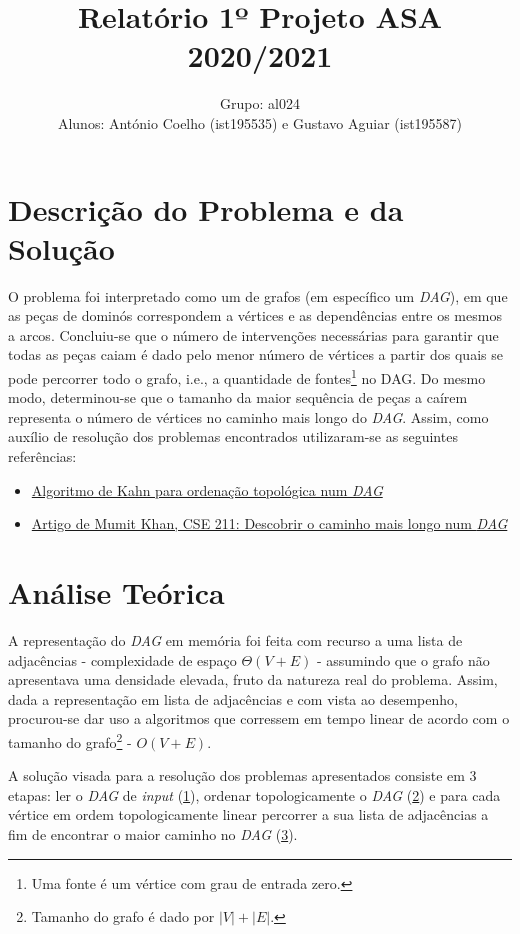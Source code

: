 \documentclass[12pt]{article}
\author{
	Grupo: al024\\Alunos: António Coelho (ist195535) e Gustavo Aguiar (ist195587)
}
\title{Relatório 1º Projeto ASA 2020/2021}
\date{}
\begin{document}
\maketitle
\section{Descrição do Problema e da Solução}
O problema foi interpretado como um de grafos (em específico um \emph{DAG}), em que as peças de dominós correspondem a vértices e as dependências entre os mesmos a arcos. Concluiu-se que o número de intervenções necessárias para garantir que todas as peças caiam é dado pelo menor número de vértices a partir dos quais se pode percorrer todo o grafo, i.e., a quantidade de fontes\footnote{Uma fonte é um vértice com grau de entrada zero.} no DAG. Do mesmo modo, determinou-se que o tamanho da maior sequência de peças a caírem representa o número de vértices no caminho mais longo do \emph{DAG}.
Assim, como auxílio de resolução dos problemas encontrados utilizaram-se as seguintes referências:
\begin{itemize}
\item\href{https://www.geeksforgeeks.org/topological-sorting-indegree-based-solution/}{Algoritmo de Kahn para ordenação topológica num \emph{DAG}}
\item\href{https://www.mathcs.emory.edu/~cheung/Courses/171/Syllabus/11-Graph/Docs/longest-path-in-dag.pdf}{Artigo de Mumit Khan, CSE 211: Descobrir o caminho mais longo num \emph{DAG}}
\end{itemize}
 
 \section{Análise Teórica}
A representação do \emph{DAG} em memória foi feita com recurso a uma lista de adjacências - complexidade de espaço $\Theta{(V+E)}$ - assumindo que o grafo não apresentava uma densidade elevada, fruto da natureza real do problema. Assim, dada a representação em lista de adjacências e com vista ao desempenho, procurou-se dar uso a algoritmos que corressem em tempo linear de acordo com o tamanho do grafo\footnote{Tamanho do grafo é dado por \href{https://bit.ly/3gfDEJJ}{$\left|V\right|+\left|E\right|$}.} - $O(V+E)$.

A solução visada para a resolução dos problemas apresentados consiste em 3 etapas: ler o \emph{DAG} de \emph{input} (\underline{1}), ordenar topologicamente o \emph{DAG} (\underline{2}) e para cada vértice em ordem topologicamente linear percorrer a sua lista de adjacências a fim de encontrar o maior caminho no \emph{DAG} (\underline{3}).
\end{document}
